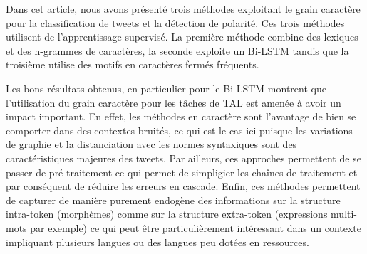 \label{sec:conclusion}
 Dans cet article, nous avons présenté trois méthodes exploitant le grain caractère pour la classification de tweets et la détection de polarité. Ces trois méthodes utilisent de l'apprentissage supervisé.
 La première méthode combine des lexiques et des n-grammes de caractères, la seconde exploite un Bi-LSTM tandis que la troisième utilise des motifs en caractères fermés fréquents.

 Les bons résultats obtenus, en particulier pour le Bi-LSTM montrent que l'utilisation du grain caractère pour les tâches de TAL est amenée à avoir un impact important.
 En effet, les méthodes en caractère sont l'avantage de bien se comporter dans des contextes bruités, ce qui est le cas ici puisque les variations de graphie et la distanciation avec les normes syntaxiques sont des caractéristiques majeures des tweets. 
Par ailleurs, ces approches permettent de se passer de pré-traitement ce qui permet de simpligier les chaînes de traitement et par conséquent de réduire les erreurs en cascade\cite{Lejeune-2014}.
Enfin, ces méthodes permettent de capturer de manière purement endogène des informations sur la structure intra-token (morphèmes) comme sur la structure extra-token (expressions multi-mots par exemple) ce qui peut être particulièrement intéressant dans un contexte impliquant plusieurs langues ou des langues peu dotées en ressources.
